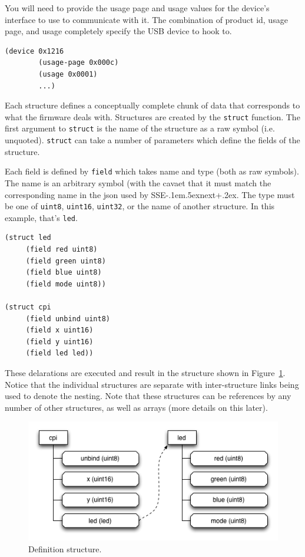 \documentclass[12pt]{article}
\def\SSEnext{SSE\kern-.1em\lower.5ex\hbox{\footnotesize next}\kern+.2ex}
\def\SSEnext{SSE\kern-.1em\lower.5ex\hbox{\footnotesize next}\kern+.2ex}
\begin{document}
You will need to provide the usage page and usage values for the
device's interface to use to communicate with it. The combination of
product id, usage page, and usage completely specify the USB device to
hook to.

\begin{verbatim}
(device 0x1216
        (usage-page 0x000c)
        (usage 0x0001)
        ...)
\end{verbatim}

Each structure defines a conceptually complete chunk of data that
corresponds to what the firmware deals with.  Structures are created
by the \verb|struct| function. The first argument to
\verb|struct| is the name of the structure as a raw symbol (i.e.
unquoted). \verb|struct| can take a number of parameters which
define the fields of the structure.

Each field is defined by \verb|field| which takes name and type
(both as raw symbols). The name is an arbitrary symbol (with the
cavaet that it must match the corresponding name in the json used by
\SSEnext. The type must be one of \verb|uint8|, \verb|uint16|,
\verb|uint32|, or the name of another structure. In this example,
that's \verb|led|.

\begin{verbatim}
(struct led
     (field red uint8)
     (field green uint8)
     (field blue uint8)
     (field mode uint8))

(struct cpi
     (field unbind uint8)
     (field x uint16)
     (field y uint16)
     (field led led))
\end{verbatim}

These delarations are executed and result in the structure shown in
Figure~\ref{fig:defstructure}. Notice that the individual structures
are separate with inter-structure links being used to denote the
nesting. Note that these structures can be references by any number of
other structures, as well as arrays (more details on this later).

\begin{figure}[htbp] %
   \centering
   \includegraphics[width=5in]{def_structure.png} 
\caption{Definition structure.}
\label{fig:defstructure}
\end{figure}
\end{document}
